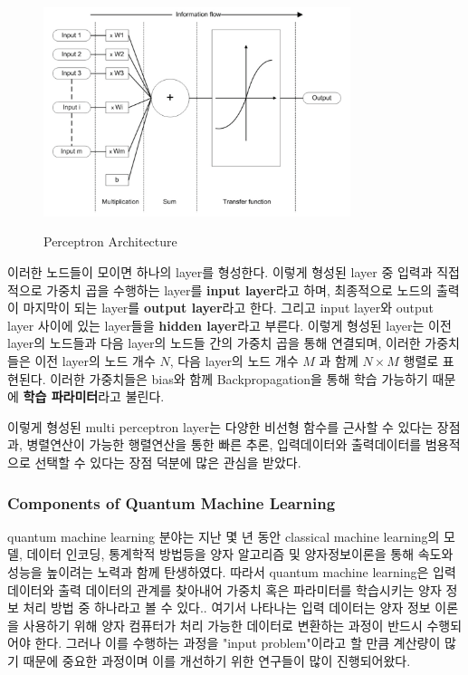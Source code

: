 \begin{figure}[htb!]
    \centering
    \includegraphics[width=0.8\textwidth]{figs/node.png}\
    \caption{Perceptron Architecture}
    \label{fig:node-image}
\end{figure}

이러한 노드들이 모이면 하나의 layer를 형성한다. 이렇게 형성된 layer 중 입력과 직접적으로 가중치 곱을 수행하는 layer를 \textbf{input layer}라고 하며, 최종적으로 노드의 출력이 마지막이 되는 layer를 \textbf{output layer}라고 한다. 그리고 input layer와 output layer 사이에 있는 layer들을 \textbf{hidden layer}라고 부른다.\cite{popescu2009multilayer} 이렇게 형성된 layer는 이전 layer의 노드들과 다음 layer의 노드들 간의 가중치 곱을 통해 연결되며, 이러한 가중치들은 이전 layer의 노드 개수 $N$, 다음 layer의 노드 개수 $M$ 과 함께 $N \times M $ 행렬로 표현된다. 이러한 가중치들은 bias와 함께 Backpropagation을 통해 학습 가능하기 때문에 \textbf{학습 파라미터}라고 불린다.

이렇게 형성된 multi perceptron layer는 다양한 비선형 함수를 근사할 수 있다는 장점과, 병렬연산이 가능한 행렬연산을 통한 빠른 추론, 입력데이터와 출력데이터를 범용적으로 선택할 수 있다는 장점 덕분에 많은 관심을 받았다.

\subsubsection{Components of Quantum Machine Learning}
quantum machine learning 분야는 지난 몇 년 동안 classical machine learning의 모델, 데이터 인코딩, 통계학적 방법등을 양자 알고리즘 및 양자정보이론을 통해 속도와 성능을 높이려는 노력과 함께 탄생하였다. 따라서 quantum machine learning은 입력 데이터와 출력 데이터의 관계를 찾아내어 가중치 혹은 파라미터를 학습시키는 양자 정보 처리 방법 중 하나라고 볼 수 있다.\cite{schuld2015introduction}. 여기서 나타나는 입력 데이터는 양자 정보 이론을 사용하기 위해 양자 컴퓨터가 처리 가능한 데이터로 변환하는 과정이 반드시 수행되어야 한다. 그러나 이를 수행하는 과정을 "input problem"이라고 할 만큼 계산량이 많기 때문에 중요한 과정이며 이를 개선하기 위한 연구들이 많이 진행되어왔다.\cite{biamonte2017quantum}

